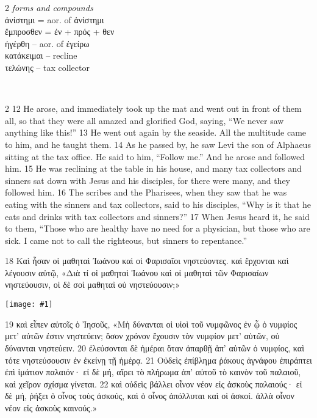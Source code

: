 \documentclass[10pt,a5paper,twoside,twocolumn]{book}
\newcommand{\fig}[1]{\texttt{[image: \#1]}\label{fig:#1}}
\newcommand*\cleartoleftpage{%
  \ifodd\value{page}\hbox{}\clearpage\fi
}
\newcommand{\separator}{\hspace{0.27\textwidth}\noindent\makebox[\linewidth]{\resizebox{0.3333\linewidth}{1pt}{$\bullet$}}\bigskip}
\newenvironment{facing}{\cleartoleftpage}{\clearpage\pagebreak}
\newenvironment{help}{\clearpage}{}
\newenvironment{helpsec}{\begin{minipage}[t]{\textwidth}\begin{multicols}{2}}{\end{multicols}\end{minipage}}
\newenvironment{vocab}{\begin{helpsec}}{\end{helpsec}}
\newenvironment{translation}{\separator\\\begin{helpsec}\footnotesize}{\end{helpsec}}
\begin{document}
\begin{facing}
\begin{help}
\begin{vocab}
\emph{forms and compounds}\\
ἀνίστημι = aor. of ἀνίστημι\\
ἔμπροσθεν = ἐν + πρός + θεν \\
ἠγέρθη -- aor. of ἐγείρω\\
κατάκειμαι -- recline\\
τελώνης -- tax collector\\
\end{vocab}
\begin{translation}
 12 He arose, and immediately took up the mat and went out in front of them all, so that they were all amazed and glorified God, saying, ``We never saw anything like this!''
13 He went out again by the seaside. All the multitude came to him, and he taught them. 14 As he passed by, he saw Levi the son of Alphaeus sitting at the tax office. He said to him, ``Follow me.'' And he arose and followed him.
15 He was reclining at the table in his house, and many tax collectors and sinners sat down with Jesus and his disciples, for there were many, and they followed him. 16 The scribes and the Pharisees, when they saw that he was eating with the sinners and tax collectors, said to his disciples, ``Why is it that he eats and drinks with tax collectors and sinners?''
17 When Jesus heard it, he said to them, ``Those who are healthy have no need for a physician, but those who are sick. I came not to call the righteous, but sinners to repentance.'' 
\end{translation}
\end{help}
\end{facing}


18 Καὶ ἦσαν οἱ μαθηταὶ Ἰωάνου καὶ οἱ Φαρισαῖοι νηστεύοντες. καὶ ἔρχονται καὶ λέγουσιν αὐτῷ,
«Διὰ τί οἱ μαθηταὶ Ἰωάνου καὶ οἱ μαθηταὶ τῶν Φαρισαίων νηστεύουσιν, οἱ δὲ σοὶ μαθηταὶ οὐ νηστεύουσιν;»

\fig{02-19} %

19 καὶ εἶπεν αὐτοῖς ὁ Ἰησοῦς, «Μὴ δύνανται οἱ υἱοὶ τοῦ νυμφῶνος ἐν ᾧ ὁ νυμφίος μετ’ αὐτῶν ἐστιν νηστεύειν; ὅσον χρόνον ἔχουσιν τὸν νυμφίον μετ’ αὐτῶν, οὐ δύνανται νηστεύειν. 20 ἐλεύσονται δὲ ἡμέραι ὅταν ἀπαρθῇ ἀπ’ αὐτῶν ὁ νυμφίος, καὶ τότε νηστεύσουσιν ἐν ἐκείνῃ τῇ ἡμέρᾳ. 21 Οὐδεὶς ἐπίβλημα ῥάκους ἀγνάφου ἐπιράπτει ἐπὶ ἱμάτιον παλαιόν· εἰ δὲ μή, αἴρει τὸ πλήρωμα ἀπ’ αὐτοῦ τὸ καινὸν τοῦ παλαιοῦ, καὶ χεῖρον σχίσμα γίνεται. 22 καὶ οὐδεὶς βάλλει οἶνον νέον εἰς ἀσκοὺς παλαιούς· εἰ δὲ μή, ῥήξει ὁ οἶνος τοὺς ἀσκούς, καὶ ὁ οἶνος ἀπόλλυται καὶ οἱ ἀσκοί. ἀλλὰ οἶνον νέον εἰς ἀσκοὺς καινούς.»
\end{document}
